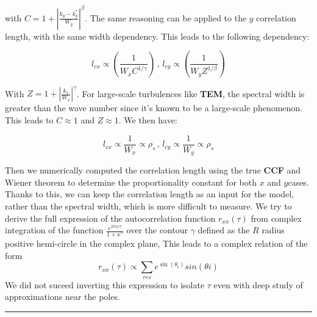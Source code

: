 \documentclass[11pt,a4paper,openany]{report}
\begin{document}
\begin{multicols}{2}
    with $ C = 1 + \left| \frac{k_y - k_y^*}{W_y} \right|^\beta $. The same reasoning can be applied to the \( y \) correlation length, with the same width dependency. This leads to the following dependency:

    $$
        l_{cx} \propto \left(\frac{1}{W_x C^{1/ \gamma}}\right) \, ,\, l_{cy} \propto \left(\frac{1}{W_y Z^{1/ \beta}}\right)
    $$

    With $ Z = 1 + \left| \frac{k_x}{W_x} \right|^\gamma $. For large-scale turbulences like \textbf{TEM}, the spectral width is greater than the wave number since it's known to be a large-scale phenomenon. This leads to $ C \approx 1 $ and $ Z \approx 1 $. We then have:

    $$
        l_{cx} \propto \frac{1}{W_x}  \propto \rho_s \, ,\, l_{cy} \propto \frac{1}{W_y} \propto \rho_s
    $$

    Then we numerically computed the correlation length using the true \textbf{CCF} and Wiener theorem to determine the proportionality constant for both $ x $ and $ y $cases. Thanks to this, we can keep the correlation length as an input for the model, rather than the spectral width, which is more difficult to measure. We try to derive the full expression of the autocorrelation function $r_{xx}(\tau)$ from complex integration of the function $\frac{e^{2\pi ix \tau}}{1 + x^\gamma}$ over the contour $\gamma$ defined as the $R$ radius positive hemi-circle in the complex plane, This leads to a complex relation of the form $$r_{x x}(\tau) \propto \sum_{res} e^{\sin(\theta_i)}sin(\theta i) $$ We did not suceed inverting this expression to isolate $\tau$ even with deep study of approximations near the poles.
\end{multicols}
\noindent
\rule{\linewidth}{0.4pt}
\end{document}
